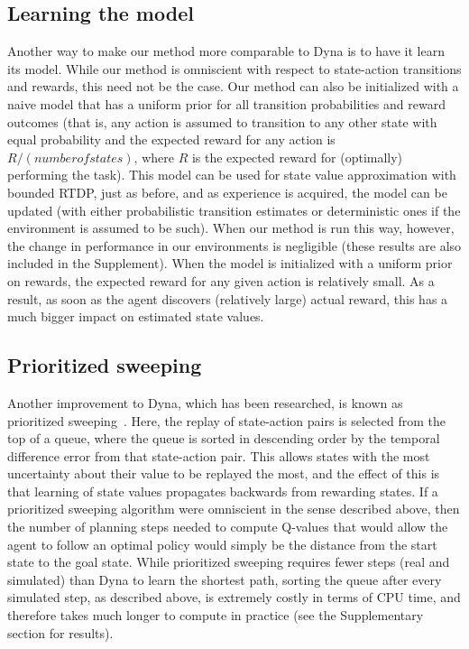 \documentclass[letterpaper]{article}
\begin{document}
\subsection{Learning the model}

Another way to make our method more comparable to Dyna is to have it learn its model. While our method is omniscient with respect to state-action transitions and rewards, this need not be the case. Our method can also be initialized with a naive model that has a uniform prior for all transition probabilities and reward outcomes (that is, any action is assumed to transition to any other state with equal probability and the expected reward for any action is $R/(number of states)$, where $R$ is the expected reward for (optimally) performing the task). This model can be used for state value approximation with bounded RTDP, just as before, and as experience is acquired, the model can be updated (with either probabilistic transition estimates or deterministic ones if the environment is assumed to be such). When our method is run this way, however, the change in performance in our environments is negligible (these results are also included in the Supplement). When the model is initialized with a uniform prior on rewards, the expected reward for any given action is relatively small. As a result, as soon as the agent discovers (relatively large) actual reward, this has a much bigger impact on estimated state values.

\subsection{Prioritized sweeping}

Another improvement to Dyna, which has been researched, is known as prioritized sweeping~\cite{moore1993prioritized}. Here, the replay of state-action pairs is selected from the top of a queue, where the queue is sorted in descending order by the temporal difference error from that state-action pair. This allows states with the most uncertainty about their value to be replayed the most, and the effect of this is that learning of state values propagates backwards from rewarding states. If a prioritized sweeping algorithm were omniscient in the sense described above, then the number of planning steps needed to compute Q-values that would allow the agent to follow an optimal policy would simply be the distance from the start state to the goal state. While prioritized sweeping requires fewer steps (real and simulated) than Dyna to learn the shortest path, sorting the queue after every simulated step, as described above, is extremely costly in terms of CPU time, and therefore takes much longer to compute in practice (see the Supplementary section for results).
\end{document}

